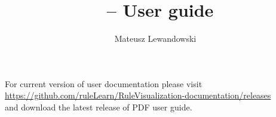 \documentclass[12pt]{article}
\title{\appname \ -- User guide}
\author{Mateusz Lewandowski}
\begin{document}
\maketitle

For current version of user documentation please visit\\ \href{https://github.com/ruleLearn/RuleVisualization-documentation/releases}{https://github.com/ruleLearn/RuleVisualization-documentation/releases}\\
and download the latest release of PDF user guide.
\end{document}
